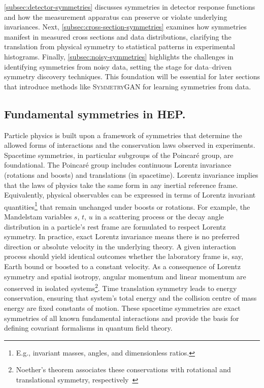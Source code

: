     \cref{subsec:detector-symmetries} discusses symmetries in detector response functions and how the measurement apparatus can preserve or violate underlying invariances.
    Next, \cref{subsec:cross-section-symmetries} examines how symmetries manifest in measured cross sections and data distributions, clarifying the translation from physical symmetry to statistical patterns in experimental histograms.
    Finally, \cref{subsec:noisy-symmetries} highlights the challenges in identifying symmetries from noisy data, setting the stage for data--driven symmetry discovery techniques.
    This foundation will be essential for later sections that introduce methods like \textsc{SymmetryGAN} for learning symmetries from data.

    \subsection{Fundamental symmetries in HEP.}
    \label{subsec:hep-symmetries}
        Particle physics is built upon a framework of symmetries that determine the allowed forms of interactions and the conservation laws observed in experiments.
        Spacetime symmetries, in particular subgroups of the Poincar\'e group, are foundational.
        The Poincar\'e group includes continuous Lorentz invariance (rotations and boosts) and translations (in spacetime).
        Lorentz invariance implies that the laws of physics take the same form in any inertial reference frame.
        Equivalently, physical observables can be expressed in terms of Lorentz invariant quantities\footnote{E.g., invariant masses, angles, and dimensionless ratios.} that remain unchanged under boosts or rotations.
        For example, the Mandelstam variables $s$, $t$, $u$ in a scattering process or the decay angle distribution in a particle's rest frame are formulated to respect Lorentz symmetry.
        In practice, exact Lorentz invariance means there is no preferred direction or absolute velocity in the underlying theory.
        A given interaction process should yield identical outcomes whether the laboratory frame is, say, Earth bound or boosted to a constant velocity.
        As a consequence of Lorentz symmetry and spatial isotropy, angular momentum and linear momentum are conserved in isolated systems\footnote{Noether’s theorem associates these conservations with rotational and translational symmetry, respectively~\cite{noauthor_nachrichten_nodate}}.
        Time translation symmetry leads to energy conservation, ensuring that system's total energy and the collision centre of mass energy are fixed constants of motion.
        These spacetime symmetries are exact symmetries of all known fundamental interactions and provide the basis for defining covariant formalisms in quantum field theory.

